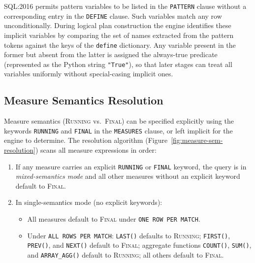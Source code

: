 SQL:2016 permits pattern variables to be listed in the
\texttt{PATTERN} clause without a corresponding entry in the
\texttt{DEFINE} clause.  Such variables match any row
unconditionally.  During logical plan construction the engine
identifies these implicit variables by comparing the set of names
extracted from the pattern tokens against the keys of the
\texttt{define} dictionary.  Any variable present in the former
but absent from the latter is assigned the always-true predicate
(represented as the Python string \texttt{"True"}), so that later
stages can treat all variables uniformly without special-casing
implicit ones.

\subsection{Measure Semantics Resolution}
\label{subsec:logical-measure-sem}

Measure semantics (\textsc{Running} vs.\ \textsc{Final}) can be
specified explicitly using the keywords \texttt{RUNNING} and
\texttt{FINAL} in the \texttt{MEASURES} clause, or left implicit
for the engine to determine.  The resolution algorithm
(Figure~\ref{fig:measure-sem-resolution}) scans all measure
expressions in order:

\begin{enumerate}
  \item If any measure carries an explicit \texttt{RUNNING} or
    \texttt{FINAL} keyword, the query is in \emph{mixed-semantics
    mode} and all other measures without an explicit keyword
    default to \textsc{Final}.

  \item In single-semantics mode (no explicit keywords):
    \begin{itemize}
      \item All measures default to \textsc{Final} under
        \texttt{ONE ROW PER MATCH}.
      \item Under \texttt{ALL ROWS PER MATCH}: \texttt{LAST()}
        defaults to \textsc{Running}; \texttt{FIRST()},
        \texttt{PREV()}, and \texttt{NEXT()} default to
        \textsc{Final}; aggregate functions \texttt{COUNT()},
        \texttt{SUM()}, and \texttt{ARRAY\_AGG()} default to
        \textsc{Running}; all others default to \textsc{Final}.
    \end{itemize}
\end{enumerate}

